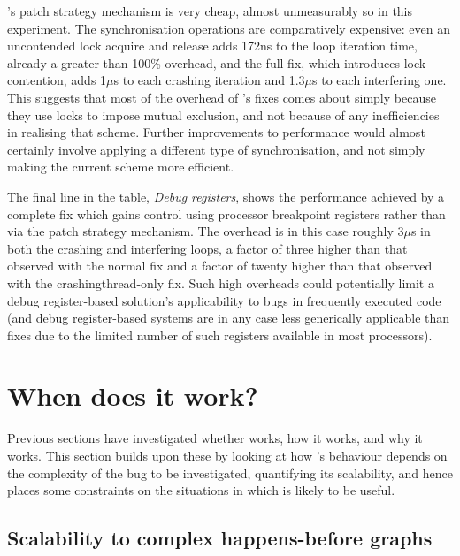{\technique}'s patch strategy mechanism is very cheap, almost
unmeasurably so in this experiment.  The synchronisation operations
are comparatively expensive: even an uncontended lock acquire and
release adds 172ns to the loop iteration time, already a greater than
100\% overhead, and the full fix, which introduces lock contention,
adds 1$\mu$s to each crashing iteration and 1.3$\mu$s to each
interfering one.  This suggests that most of the overhead of
{\implementation}'s fixes comes about simply because they use locks to
impose mutual exclusion, and not because of any inefficiencies in
realising that scheme.  Further improvements to performance would
almost certainly involve applying a different type of synchronisation,
and not simply making the current scheme more efficient.

The final line in the table, \textit{Debug registers}, shows the
performance achieved by a complete fix which gains control using
processor breakpoint registers rather than via the patch strategy
mechanism.  The overhead is in this case roughly 3$\mu$s in both the
crashing and interfering loops, a factor of three higher than that
observed with the normal {\implementation} fix and a factor of twenty
higher than that observed with the \gls{crashingthread}-only
{\implementation} fix.  Such high overheads could potentially limit a debug
register-based solution's applicability to bugs in frequently executed
code (and debug register-based systems are in any case less
generically applicable than {\implementation} fixes due to the limited
number of such registers available in most processors).

\section{When does it work?}
\label{sect:eval:does_it_scale}

Previous sections have investigated whether {\implementation} works,
how it works, and why it works.  This section builds upon these by
looking at how {\implementation}'s behaviour depends on the complexity
of the bug to be investigated, quantifying its scalability, and hence
places some constraints on the situations in which {\technique} is
likely to be useful.

\subsection{Scalability to complex happens-before graphs}
\label{sect:eval:complex_hb}


